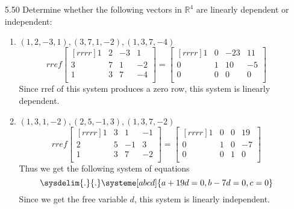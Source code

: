 \documentclass[12pt]{article}
\begin{document}
\begin{enumerate}
\item[5.50] Determine whether the following vectors in $\mathbb{R}^4$ are linearly dependent or independent:
	\begin{enumerate}
	\item $(1,2,-3,1),(3,7,1,-2),(1,3,7,-4)$
		\[ rref\begin{bmatrix}[rrrr]1&2&-3&1\\3&7&1&-2\\1&3&7&-4\\\end{bmatrix} = \begin{bmatrix}[rrrr]1&0&-23&11\\0&1&10&-5\\0&0&0&0\\\end{bmatrix} \]
		Since rref of this system produces a zero row, this system is linearly dependent.
	\item $(1,3,1,-2),(2,5,-1,3),(1,3,7,-2)$
		\[ rref\begin{bmatrix}[rrrr]1&3&1&-1\\2&5&-1&3\\1&3&7&-2\\\end{bmatrix} = \begin{bmatrix}[rrrr]1&0&0&19\\0&1&0&-7\\0&0&1&0\\\end{bmatrix} \]
		Thus we get the following system of equations
		\[ \sysdelim{.}{.}\systeme[abcd]{a+19d=0,b-7d=0,c=0} \]
		Since we get the free variable $d$, this system is linearly independent.
	\end{enumerate}
	

\end{enumerate}
\end{document}

